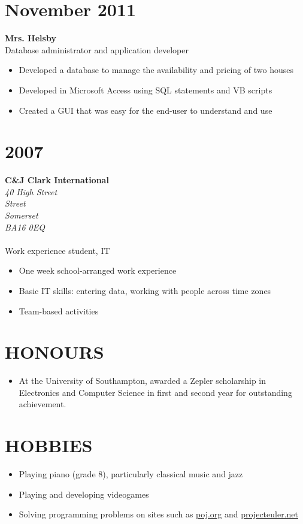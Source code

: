 \documentclass[margin]{res}
\begin{document}
\begin{resume}
\normalsize{\section{November 2011}}
{\bf Mrs. Helsby} \\
Database administrator and application developer \\
\begin{itemize}
\item Developed a database to manage the availability and pricing of two houses
\item Developed in Microsoft Access using SQL statements and VB scripts
\item Created a GUI that was easy for the end-user to understand and use
\end{itemize}

\normalsize{\section{2007}}
{\bf C\&J Clark International} \\
{\it 40 High Street \\
Street \\
Somerset \\
BA16 0EQ \\ \\}
Work experience student, IT \\
\begin{itemize}
\item One week school-arranged work experience
\item Basic IT skills: entering data, working with people across time zones
\item Team-based activities
\end{itemize}

\section{HONOURS}
\begin{itemize}
\item At the University of Southampton, awarded a Zepler scholarship in
Electronics and Computer Science in first and second year for outstanding
achievement.
\end{itemize}

\section{HOBBIES}
\begin{itemize}
\item Playing piano (grade 8), particularly classical music and jazz
\item Playing and developing videogames
\item Solving programming problems on sites such as
\href{http://poj.org/}{poj.org} and
\href{https://projecteuler.net/}{projecteuler.net}
\end{itemize}

\end{resume}
\end{document}
